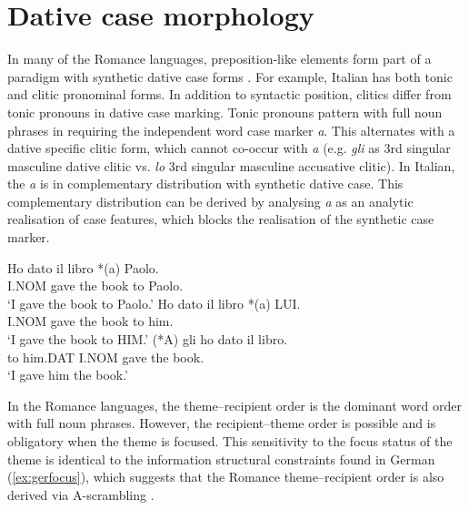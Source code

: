 \section{Dative case morphology}\label{sec:case-morph}
In many of the Romance languages, preposition-like elements form part of a paradigm with synthetic dative case forms \citep{Kayne.1984}. For example, Italian has both tonic and clitic pronominal forms. In addition to syntactic position, clitics differ from tonic pronouns in dative case marking. Tonic pronouns pattern with full noun phrases in requiring the independent word case marker \textit{a}. This alternates with a dative specific clitic form, which cannot co-occur with \textit{a} (e.g. \textit{gli} as 3rd singular masculine dative clitic vs. \textit{lo} 3rd singular masculine accusative clitic). In Italian, the \textit{a} is in complementary distribution with synthetic dative case. This complementary distribution can be derived by analysing \textit{a} as an analytic realisation of case features, which blocks the realisation of the synthetic case marker. 
\begin{exe}
\ex \cite[sec. 4.3.1]{Proudfoot.2013}
\begin{xlist}
\ex \gll Ho dato il libro *(a) Paolo.\\
I.NOM gave the book to Paolo.\\
\trans `I gave the book to Paolo.'
\ex \gll Ho dato il libro *(a) LUI.\\
I.NOM gave the book to him.\\
\trans `I gave the book to HIM.'
\ex \gll (*A) gli ho dato il libro.\\
to him.DAT I.NOM gave the book.\\
\trans `I gave him the book.'
\end{xlist}
\end{exe}%
In the Romance languages, the theme--recipient order is the dominant word order with full noun phrases. However, the recipient--theme order is possible and is obligatory when the theme is focused. This sensitivity to the focus status of the theme is identical to the information structural constraints found in German (\ref{ex:gerfocus}), which suggests that the Romance theme--recipient order is also derived via A-scrambling \citep{Takano.1998}. 
\begin{exe}
\ex \cite[ex 26]{Belletti.1995}
\begin{xlist}
\end{xlist} 
\end{exe}%
